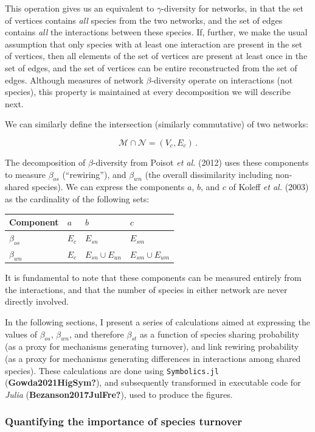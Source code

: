 \documentclass[11pt]{article}
\begin{document}
This operation gives us an equivalent to \(\gamma\)-diversity for
networks, in that the set of vertices contains \emph{all} species from
the two networks, and the set of edges contains \emph{all} the
interactions between these species. If, further, we make the usual
assumption that only species with at least one interaction are present
in the set of vertices, then all elements of the set of vertices are
present at least once in the set of edges, and the set of vertices can
be entire reconstructed from the set of edges. Although measures of
network \(\beta\)-diversity operate on interactions (not species), this
property is maintained at every decomposition we will describe next.

We can similarly define the intersection (similarly commutative) of two
networks:

\[\mathcal{M} \cap \mathcal{N} = (V_c, E_c)\,.\]

The decomposition of \(\beta\)-diversity from Poisot \emph{et al.}
(2012) uses these components to measure \(\beta_{os}\) (``rewiring''),
and \(\beta_{wn}\) (the overall dissimilarity including non-shared
species). We can express the components \(a\), \(b\), and \(c\) of
Koleff \emph{et al.} (2003) as the cardinality of the following sets:

\begin{longtable}[]{@{}llll@{}}
\toprule
Component & \(a\) & \(b\) & \(c\)\tabularnewline
\midrule
\endhead
\(\beta_{os}\) & \(E_c\) & \(E_{sn}\) & \(E_{sm}\)\tabularnewline
\(\beta_{wn}\) & \(E_c\) & \(E_{sn} \cup E_{un}\) &
\(E_{sm} \cup E_{um}\)\tabularnewline
\bottomrule
\end{longtable}

It is fundamental to note that these components can be measured entirely
from the interactions, and that the number of species in either network
are never directly involved.

In the following sections, I present a series of calculations aimed at
expressing the values of \(\beta_{os}\), \(\beta_{wn}\), and therefore
\(\beta_{st}\) as a function of species sharing probability (as a proxy
for mechanisms generating turnover), and link rewiring probability (as a
proxy for mechanisms generating differences in interactions among shared
species). These calculations are done using \texttt{Symbolics.jl}
(\textbf{Gowda2021HigSym?}), and subsequently transformed in executable
code for \emph{Julia} (\textbf{Bezanson2017JulFre?}), used to produce
the figures.

\hypertarget{quantifying-the-importance-of-species-turnover}{%
\subsubsection{Quantifying the importance of species
turnover}\label{quantifying-the-importance-of-species-turnover}}
\end{document}
